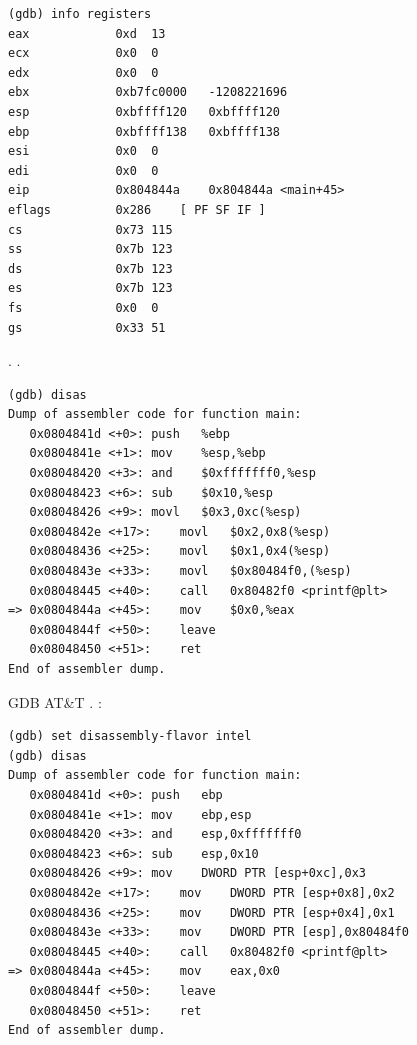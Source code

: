 \begin{lstlisting}
(gdb) info registers
eax            0xd	13
ecx            0x0	0
edx            0x0	0
ebx            0xb7fc0000	-1208221696
esp            0xbffff120	0xbffff120
ebp            0xbffff138	0xbffff138
esi            0x0	0
edi            0x0	0
eip            0x804844a	0x804844a <main+45>
eflags         0x286	[ PF SF IF ]
cs             0x73	115
ss             0x7b	123
ds             0x7b	123
es             0x7b	123
fs             0x0	0
gs             0x33	51
\end{lstlisting}

.
.

\begin{lstlisting}
(gdb) disas
Dump of assembler code for function main:
   0x0804841d <+0>:	push   %ebp
   0x0804841e <+1>:	mov    %esp,%ebp
   0x08048420 <+3>:	and    $0xfffffff0,%esp
   0x08048423 <+6>:	sub    $0x10,%esp
   0x08048426 <+9>:	movl   $0x3,0xc(%esp)
   0x0804842e <+17>:	movl   $0x2,0x8(%esp)
   0x08048436 <+25>:	movl   $0x1,0x4(%esp)
   0x0804843e <+33>:	movl   $0x80484f0,(%esp)
   0x08048445 <+40>:	call   0x80482f0 <printf@plt>
=> 0x0804844a <+45>:	mov    $0x0,%eax
   0x0804844f <+50>:	leave  
   0x08048450 <+51>:	ret    
End of assembler dump.
\end{lstlisting}

GDB  AT\&T 
.
:

\begin{lstlisting}
(gdb) set disassembly-flavor intel
(gdb) disas
Dump of assembler code for function main:
   0x0804841d <+0>:	push   ebp
   0x0804841e <+1>:	mov    ebp,esp
   0x08048420 <+3>:	and    esp,0xfffffff0
   0x08048423 <+6>:	sub    esp,0x10
   0x08048426 <+9>:	mov    DWORD PTR [esp+0xc],0x3
   0x0804842e <+17>:	mov    DWORD PTR [esp+0x8],0x2
   0x08048436 <+25>:	mov    DWORD PTR [esp+0x4],0x1
   0x0804843e <+33>:	mov    DWORD PTR [esp],0x80484f0
   0x08048445 <+40>:	call   0x80482f0 <printf@plt>
=> 0x0804844a <+45>:	mov    eax,0x0
   0x0804844f <+50>:	leave  
   0x08048450 <+51>:	ret    
End of assembler dump.
\end{lstlisting}

